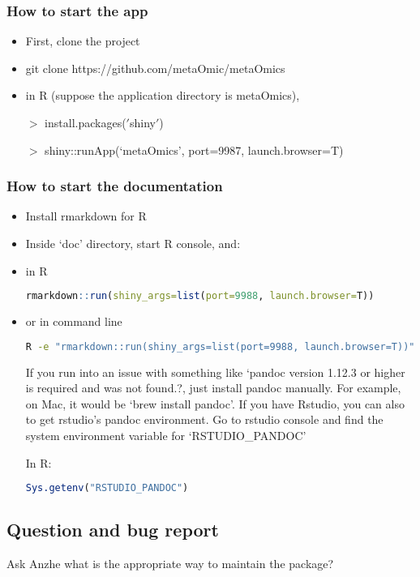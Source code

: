 \subsubsection{How to start the app}
\begin{itemize}
\item First, clone the project
\item git clone https://github.com/metaOmic/metaOmics
\item in R (suppose the application directory is metaOmics),

$>$ install.packages($'$shiny$'$)

$>$ shiny::runApp(`metaOmics', port=9987, launch.browser=T)
\end{itemize}

\subsubsection{How to start the documentation}
\begin{itemize}
\item Install rmarkdown for R
\item Inside `doc' directory, start R console, and:
\item in R
\begin{lstlisting}[language=R]
rmarkdown::run(shiny_args=list(port=9988, launch.browser=T))
\end{lstlisting}

\item or in command line
\begin{lstlisting}[language=bash]
R -e "rmarkdown::run(shiny_args=list(port=9988, launch.browser=T))"
\end{lstlisting}

If you run into an issue with something like `pandoc version 1.12.3 or higher is required and was not found.?, just install pandoc manually. For example, on Mac, it would be `brew install pandoc'. If you have Rstudio, you can also to get rstudio's pandoc environment. Go to rstudio console and find the system environment variable for `RSTUDIO\_PANDOC'

In R: 

\begin{lstlisting}[language=R]
Sys.getenv("RSTUDIO_PANDOC")
\end{lstlisting}

\end{itemize}


\subsection{Question and bug report}
{
\color{red}
Ask Anzhe what is the appropriate way to maintain the package?
}

 
